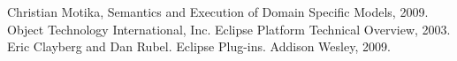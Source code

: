 \begin{thebibliography}{cmot-dt}
 Christian Motika, Semantics and Execution of
 Domain Specific Models, 2009.
 Object Technology International, Inc. Eclipse Platform Technical Overview,
2003.
 Eric Clayberg and Dan Rubel. Eclipse Plug-ins. Addison Wesley, 2009.
\end{thebibliography}
